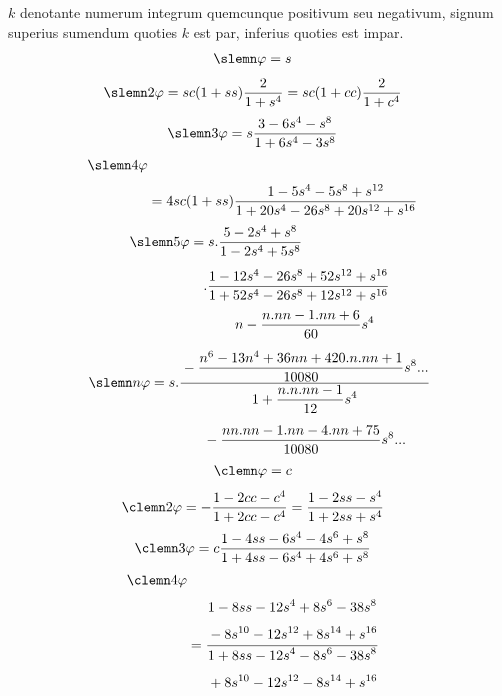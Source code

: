 $k$ denotante numerum integrum quemcunque positivum seu negativum, signum superius sumendum quoties $k$ est par, inferius quoties est impar.
\[
\begin{aligned}\slemn\varphi&=s\end{aligned}
\]
\[
\begin{aligned}\slemn2\varphi&=sc(1+ss)\dfrac2{1+s^4}=sc(1+cc)\dfrac2{1+c^4}\end{aligned}
\]
\[
\begin{aligned}\slemn3\varphi&=s\dfrac{3-6s^4-s^8}{1+6s^4-3s^8}\end{aligned}
\]
\[
\begin{aligned}\slemn4\varphi\\[3pt]&=4sc(1+ss)\dfrac{1-5s^4-5s^8+s^{12}}{1+20s^4-26s^8+20s^{12}+s^{16}}\end{aligned}
\]
\[
\begin{aligned}\slemn5\varphi&=s.\dfrac{5-2s^4+s^8}{1-2s^4+5s^8}\\[5pt]&\quad .\dfrac{1-12s^4-26s^8+52s^{12}+s^{16}}{1+52s^4-26s^8+12s^{12}+s^{16}}\end{aligned}
\]
\[
\slemn n\varphi=s.\dfrac{\begin{gathered}n-\dfrac{n.nn-1.nn+6}{60}s^4\\[5pt]{}-\dfrac{n^6-13n^4+36nn+420.n.nn+1}{10080}s^8\mathord{.}\mathord{.}\mathord{.}\end{gathered}}{\begin{gathered}1+\dfrac{n.n.nn-1}{12}s^4\\[5pt]{}-\dfrac{nn.nn-1.nn-4.nn+75}{10080}s^8\mathord{.}\mathord{.}\mathord{.}\end{gathered}}
\]
\[
\begin{aligned}\clemn\varphi&=c\end{aligned}
\]
\[
\begin{aligned}\clemn2\varphi&=-\dfrac{1-2cc-c^4}{1+2cc-c^4}=\dfrac{1-2ss-s^4}{1+2ss+s^4}\end{aligned}
\]
\[
\begin{aligned}\clemn3\varphi&=c\dfrac{1-4ss-6s^4-4s^6+s^8}{1+4ss-6s^4+4s^6+s^8}\end{aligned}
\]
\[
\begin{aligned}\clemn4\varphi\\[3pt]&=\dfrac{\begin{gathered}1-8ss-12s^4+8s^6-38s^8\\[3pt]{}-8s^{10}-12s^{12}+8s^{14}+s^{16}\end{gathered}}{\begin{gathered}1+8ss-12s^4-8s^6-38s^8\\[3pt]{}+8s^{10}-12s^{12}-8s^{14}+s^{16}\end{gathered}}\end{aligned}
\]
